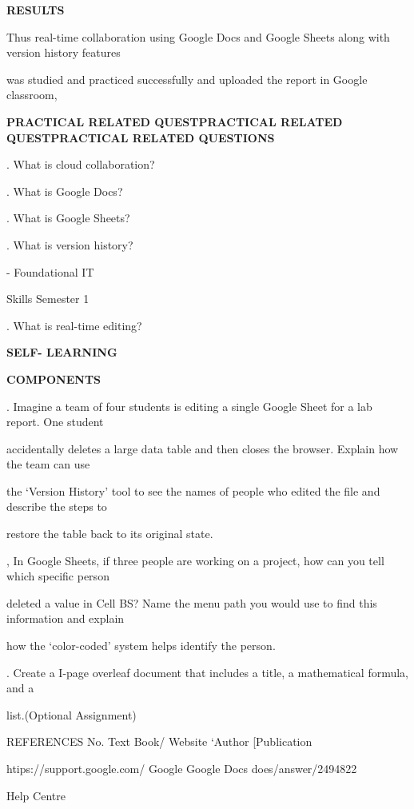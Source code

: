 \documentclass[10pt,a4paper]{article}
\begin{document}
\medskip\noindent\textbf{RESULTS}\par
\noindent Thus real-time collaboration using Google Docs and Google Sheets along with version history features\par
\noindent was studied and practiced successfully and uploaded the report in Google classroom,\par
\medskip\noindent\textbf{PRACTICAL RELATED QUESTPRACTICAL RELATED QUESTPRACTICAL RELATED QUESTIONS}\par
{}. What is cloud collaboration?\par
{}. What is Google Docs?\par
{}. What is Google Sheets?\par
{}. What is version history?\par
{} - Foundational IT\par
\noindent Skills Semester 1\par
{}. What is real-time editing?\par
\medskip\noindent\textbf{SELF- LEARNING}\par
\medskip\noindent\textbf{COMPONENTS}\par
{}. Imagine a team of four students is editing a single Google Sheet for a lab report. One student\par
\noindent accidentally deletes a large data table and then closes the browser. Explain how the team can use\par
\noindent the ‘Version History’ tool to see the names of people who edited the file and describe the steps to\par
\noindent restore the table back to its original state.\par
{}, In Google Sheets, if three people are working on a project, how can you tell which specific person\par
\noindent deleted a value in Cell BS? Name the menu path you would use to find this information and explain\par
\noindent how the ‘color-coded’ system helps identify the person.\par
{}. Create a I-page overleaf document that includes a title, a mathematical formula, and a\par
\noindent list.(Optional Assignment)\par
\noindent REFERENCES No. Text Book/ Website ‘Author [Publication\par

 htips://support.google.com/          Google                    Google Docs does/answer/2494822\par
\noindent Help Centre\par
\end{document}
